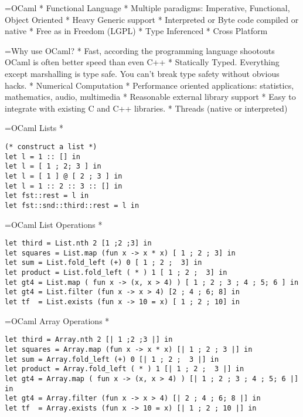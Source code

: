 \documentclass[titlepage,usenames,a4,landscape,semhelv]{seminar}
\title{\gettitle}
\author{Abram Hindle\\
Edmonton Functional Programming User Group\\
http://efpug.blogspot.ca\\
abram.hindle@softwareprocess.es\\
http://softwareprocess.es/
} \date{\today}
\begin{document}
\pagestyle{fancy} %
\begin{slide}
\maketitle

=OCaml
* Functional Language
* Multiple paradigms: Imperative, Functional, Object Oriented
* Heavy Generic support
* Interpreted or Byte code compiled or native
* Free as in Freedom (LGPL)
* Type Inferenced
* Cross Platform

=Why use OCaml?
* Fast, according the programming language shootouts OCaml is often better speed than even C++
* Statically Typed. Everything except marshalling is type safe. You can't break type safety without obvious hacks.
* Numerical Computation
* Performance oriented applications: statistics, mathematics, audio, multimedia
* Reasonable external library support
* Easy to integrate with existing C and C++ libraries.
* Threads (native or interpreted)

=OCaml Lists
*
\begin{verbatim}
(* construct a list *)
let l = 1 :: [] in
let l = [ 1 ; 2; 3 ] in
let l = [ 1 ] @ [ 2 ; 3 ] in
let l = 1 :: 2 :: 3 :: [] in
let fst::rest = l in
let fst::snd::third::rest = l in
\end{verbatim}

=OCaml List Operations
*
\begin{verbatim}
let third = List.nth 2 [1 ;2 ;3] in
let squares = List.map (fun x -> x * x) [ 1 ; 2 ; 3] in
let sum = List.fold_left (+) 0 [ 1 ; 2 ;  3] in
let product = List.fold_left ( * ) 1 [ 1 ; 2 ;  3] in
let gt4 = List.map ( fun x -> (x, x > 4) ) [ 1 ; 2 ; 3 ; 4 ; 5; 6 ] in
let gt4 = List.filter (fun x -> x > 4) [2 ; 4 ; 6; 8] in
let tf  = List.exists (fun x -> 10 = x) [ 1 ; 2 ; 10] in
\end{verbatim}

=OCaml Array Operations
*
\begin{verbatim}
let third = Array.nth 2 [| 1 ;2 ;3 |] in
let squares = Array.map (fun x -> x * x) [| 1 ; 2 ; 3 |] in
let sum = Array.fold_left (+) 0 [| 1 ; 2 ;  3 |] in
let product = Array.fold_left ( * ) 1 [| 1 ; 2 ;  3 |] in
let gt4 = Array.map ( fun x -> (x, x > 4) ) [| 1 ; 2 ; 3 ; 4 ; 5; 6 |] in
let gt4 = Array.filter (fun x -> x > 4) [| 2 ; 4 ; 6; 8 |] in
let tf  = Array.exists (fun x -> 10 = x) [| 1 ; 2 ; 10 |] in
\end{verbatim}


\end{slide}
\end{document}
